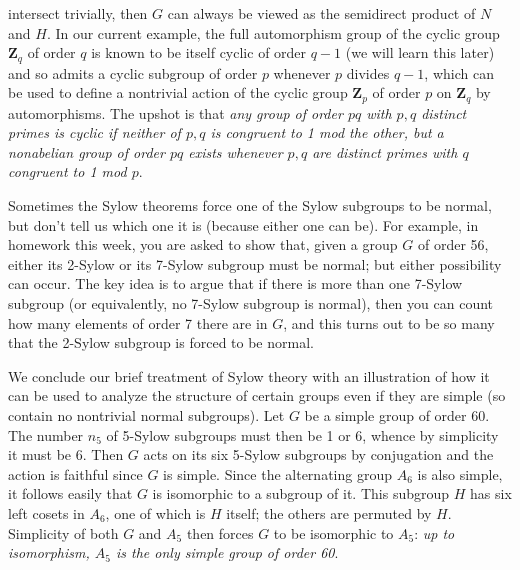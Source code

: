 \documentclass[10pt]{article}
\begin{document}
intersect trivially, then $G$ can always be viewed as the semidirect
product of $N$ and $H$. In our current example, the full automorphism
group of the cyclic group $\mathbf{Z}_q$ of order $q$ is known to be
itself cyclic of order $q-1$ (we will learn this later) and so admits a
cyclic subgroup of order $p$ whenever $p$ divides $q-1$, which can be
used to define a nontrivial action of the cyclic group $\mathbf{Z}_p$ of
order $p$ on $\mathbf{Z}_q$ by automorphisms. The upshot is that {\sl
  any group of order $pq$ with $p,q$ distinct primes is cyclic if
  neither of $p,q$ is congruent to 1 mod the other, but a nonabelian
  group of order $pq$ exists whenever $p,q$ are distinct primes with $q$
  congruent to 1 mod $p$}.

Sometimes the Sylow theorems force one of the Sylow subgroups to be
normal, but don't tell us which one it is (because either one can be).
For example, in homework this week, you are asked to show that, given a
group $G$ of order 56, either its 2-Sylow or its 7-Sylow subgroup must
be normal; but either possibility can occur. The key idea is to argue
that if there is more than one 7-Sylow subgroup (or equivalently, no
7-Sylow subgroup is normal), then you can count how many elements of
order 7 there are in $G$, and this turns out to be so many that the
2-Sylow subgroup is forced to be normal.

We conclude our brief treatment of Sylow theory with an illustration of
how it can be used to analyze the structure of certain groups even if
they are simple (so contain no nontrivial normal subgroups). Let $G$ be
a simple group of order 60. The number $n_5$ of 5-Sylow subgroups must
then be 1 or 6, whence by simplicity it must be 6. Then $G$ acts on its
six 5-Sylow subgroups by conjugation and the action is faithful since
$G$ is simple. Since the alternating group $A_6$ is also simple, it
follows easily that $G$ is isomorphic to a subgroup of it. This subgroup
$H$ has six left cosets in $A_6$, one of which is $H$ itself; the others
are permuted by $H$. Simplicity of both $G$ and $A_5$ then forces $G$ to
be isomorphic to $A_5$: {\sl up to isomorphism, $A_5$ is the only simple
  group of order 60}.
\end{document}
